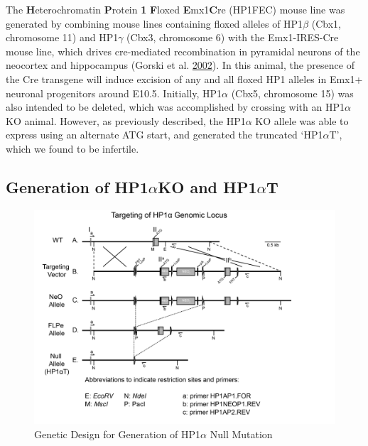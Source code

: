 \documentclass[onehalf,12pt]{beavtex}
\begin{document}
  The \textbf{H}eterochromatin \textbf{P}rotein \textbf{1} \textbf{F}loxed
  \textbf{E}mx1\textbf{C}re (HP1FEC) mouse line was generated by combining
  mouse lines containing floxed alleles of HP1\(\beta\) (Cbx1, chromosome
  11) and HP1\(\gamma\) (Cbx3, chromosome 6) with the Emx1-IRES-Cre mouse
  line, which drives cre-mediated recombination in pyramidal neurons of
  the neocortex and hippocampus (Gorski et al.
  \protect\hyperlink{ref-GorskiCorticalExcitatoryNeurons2002}{2002}). In
  this animal, the presence of the Cre transgene will induce excision of
  any and all floxed HP1 alleles in Emx1+ neuronal progenitors around
  E10.5. Initially, HP1\(\alpha\) (Cbx5, chromosome 15) was also intended
  to be deleted, which was accomplished by crossing with an HP1\(\alpha\)
  KO animal. However, as previously described, the HP1\(\alpha\) KO allele
  was able to express using an alternate ATG start, and generated the
  truncated `HP1\(\alpha\)T', which we found to be infertile.
  
  \subsection{\texorpdfstring{Generation of HP1\(\alpha\)KO and
  HP1\(\alpha\)T}{Generation of HP1\textbackslash{}alphaKO and HP1\textbackslash{}alphaT}}\label{HP1anull}
  
  \begin{figure}
  
  {\centering \includegraphics[width=1\linewidth]{./data/methods/HP1aTargeting} 
  
  }
  
  \caption[Genetic Design for Generation of HP1$\alpha$ Null Mutation]{Genetic Design for Generation of HP1$\alpha$ Null Mutation}\label{fig:HP1atargeting}
  \end{figure}
  
\end{document}
